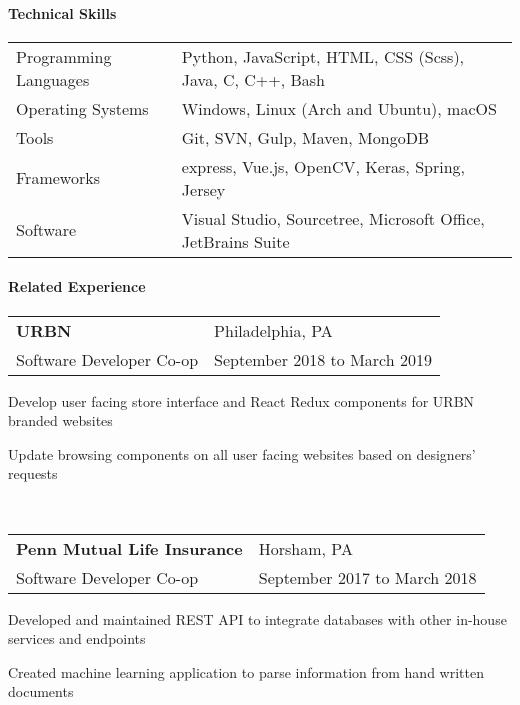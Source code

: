 \documentclass[10pt,]{article}
\let\oldparagraph\paragraph
\renewcommand{\paragraph}[1]{\oldparagraph{#1}\mbox{}}
\begin{document}
\hypertarget{technical-skills}{%
\paragraph{Technical Skills}\label{technical-skills}}

\begin{tabular}{l | l}
    Programming Languages & Python, JavaScript, HTML, CSS (Scss), Java, C, C++, Bash\\
    Operating Systems     & Windows, Linux (Arch and Ubuntu), macOS\\
    Tools             & Git, SVN, Gulp, Maven, MongoDB\\
    Frameworks        & express, Vue.js, OpenCV, Keras, Spring, Jersey\\
    Software          & Visual Studio, Sourcetree, Microsoft Office, JetBrains Suite
\end{tabular}

\hypertarget{related-experience}{%
\paragraph{Related Experience}\label{related-experience}}

\begin{tabularx}{\textwidth}{l X}
    \textbf{URBN} & \hfill Philadelphia, PA\\
    Software Developer Co-op        & \hfill September 2018 to March 2019
\end{tabularx}

\begin{list}{\quad}{}
    \item Develop user facing store interface and React Redux components for URBN branded websites
    \item Update browsing components on all user facing websites based on designers' requests
\end{list}

~

\begin{tabularx}{\textwidth}{l X}
    \textbf{Penn Mutual Life Insurance} & \hfill Horsham, PA\\
    Software Developer Co-op        & \hfill September 2017 to March 2018
\end{tabularx}

\begin{list}{\quad}{}
    \item Developed and maintained REST API to integrate databases with other in-house services and endpoints
    \item Created machine learning application to parse information from hand written documents
\end{list}
\end{document}

